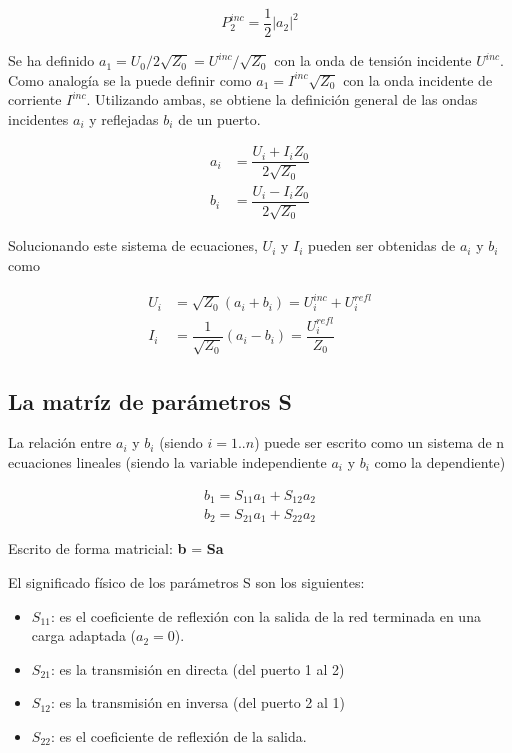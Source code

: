 $$
P_2^{inc}=\dfrac{1}{2}|a_2|^2
$$

Se ha definido $a_1 = U_0/2\sqrt{Z_0} = U^{inc}/\sqrt{Z_0}$ con la onda de tensión incidente $U^{inc}$. Como analogía 
se la puede definir como $a_1 = I^{inc}\sqrt{Z_0}$ con la onda incidente de corriente $I^{inc}$. Utilizando ambas, se obtiene la 
definición general de las ondas incidentes $a_i$ y reflejadas $b_i$ de un puerto.

\begin{equation}
\begin{aligned}
	a_i &= \dfrac{U_i + I_iZ_0}{2\sqrt{Z_0}} \\
	b_i &= \dfrac{U_i - I_iZ_0}{2\sqrt{Z_0}}
\end{aligned}
\label{eq:waves}
\end{equation}

Solucionando este sistema de ecuaciones, $U_i$ y $I_i$ pueden ser obtenidas de $a_i$ y $b_i$ como

\begin{equation}
\begin{aligned}
	U_i &= \sqrt{Z_0}(a_i + b_i) = U_i^{inc} + U_i^{refl}\\
	I_i &= \dfrac{1}{\sqrt{Z_0}}(a_i - b_i) = \dfrac{U_i^{refl}}{Z_0}
\end{aligned}
\end{equation}


\subsection{La matríz de parámetros S}

La relación entre $a_i$ y $b_i$ (siendo $i=1..n$) puede ser escrito como un sistema de n ecuaciones lineales (siendo la variable 
independiente $a_i$ y $b_i$ como la dependiente)

\begin{equation}
\begin{aligned}
	b_1 = S_{11}a_1 + S_{12}a_2 \\
	b_2 = S_{21}a_1 + S_{22}a_2
\end{aligned}
\label{eq:s_matrix}
\end{equation}
	
Escrito de forma matricial: \textbf{b} = \textbf{Sa}

El significado físico de los parámetros S son los siguientes:
\begin{itemize}
	\item $S_{11}$: es el coeficiente de reflexión con la salida de la red terminada en una carga adaptada ($a_2 = 0$).
	\item $S_{21}$: es la transmisión en directa (del puerto 1 al 2)
	\item $S_{12}$: es la transmisión en inversa (del puerto 2 al 1)
	\item $S_{22}$: es el coeficiente de reflexión de la salida. 
\end{itemize}

